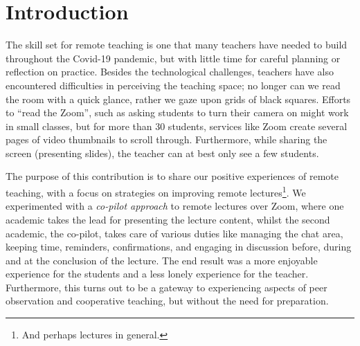 \documentclass[sigconf,natbib=false]{acmart}
\begin{document}

\keywords{}

\maketitle

\section{Introduction}

The skill set for remote teaching is one that many teachers have needed to  build throughout the Covid-19 pandemic, but with little time for careful planning or reflection on practice. Besides the technological challenges, teachers have also encountered difficulties in perceiving the teaching space; no longer can we read the room with a quick glance, rather we gaze upon grids of black squares. Efforts to \enquote{read the Zoom}, such as asking students to turn their camera on might work in small classes, but for more than 30 students, services like Zoom create several pages of video thumbnails to scroll through. Furthermore, while sharing the screen (\eg presenting slides), the teacher can at best only see a few students.

The purpose of this contribution is to share our positive experiences of remote teaching, with a focus on strategies on improving remote lectures\footnote{And perhaps lectures in general.}. We experimented with a \emph{co-pilot approach} to remote lectures over Zoom, where one academic takes the lead for presenting the lecture content, whilst the second academic, the co-pilot, takes care of various duties like managing the chat area, keeping time, reminders, confirmations, and engaging in discussion before, during and at the conclusion of the lecture. The end result was a more enjoyable experience for the students and a less lonely experience for the teacher. Furthermore, this turns out to be a gateway to experiencing aspects of peer observation and cooperative teaching, but without the need for preparation.
\end{document}
